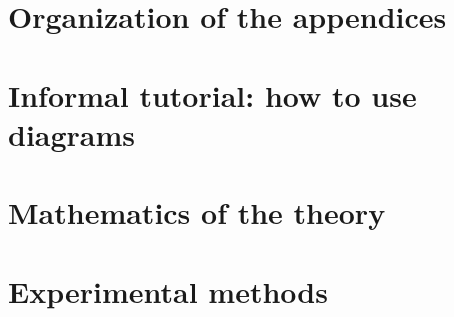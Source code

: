     
    
    \appendix

    \newpage
    \section*{Organization of the appendices}
        

    \newpage
    \section{Informal tutorial: how to use diagrams}\label{appendix:tutorial}
        
    
    \newpage
    \section{Mathematics of the theory}\label{appendix:math}
        
    
    \newpage
    \section{Experimental methods}\label{appendix:experiments}
        
    


